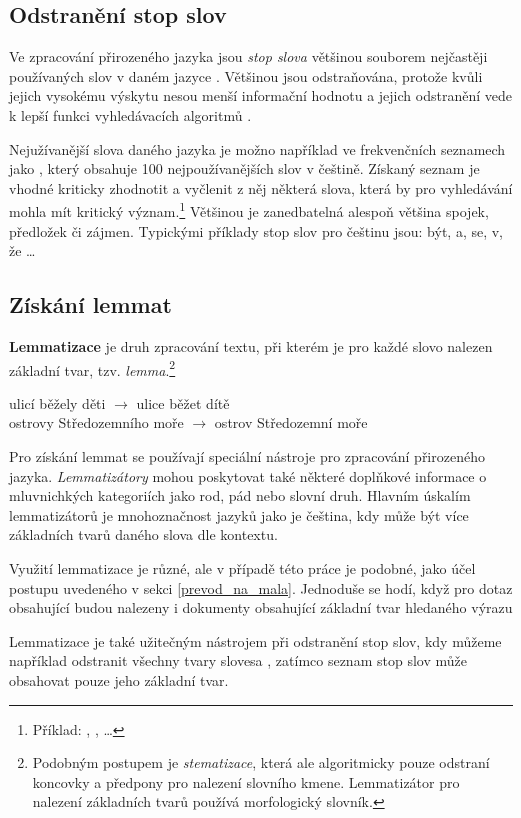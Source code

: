 \subsection{Odstranění stop slov}
\label{stopwords}
Ve zpracování přirozeného jazyka jsou \emph{stop slova} většinou souborem nejčastěji používaných slov v daném jazyce \cite{wiki:stopwords}. Většinou jsou odstraňována, protože kvůli jejich vysokému výskytu nesou menší informační hodnotu a jejich odstranění vede k lepší funkci vyhledávacích algoritmů \cite{bm25_improvements}.\par
Nejužívanější slova daného jazyka je možno například ve frekvenčních seznamech jako \cite{wiki:frekvencni_seznam}, který obsahuje 100 nejpoužívanějších slov v češtině. Získaný seznam je vhodné kriticky zhodnotit a vyčlenit z něj některá slova, která by pro vyhledávání mohla mít kritický význam.\footnote{Příklad: , ,  \dots} Většinou je zanedbatelná alespoň většina spojek, předložek či zájmen. Typickými příklady stop slov pro češtinu jsou: být, a, se, v, že \dots

\subsection{Získání lemmat}
\textbf{Lemmatizace} je druh zpracování textu, při kterém je pro každé slovo nalezen základní tvar, tzv. \emph{lemma}.\footnote{Podobným postupem je \emph{stematizace}, která ale algoritmicky pouze odstraní koncovky a předpony pro nalezení slovního kmene. Lemmatizátor pro nalezení základních tvarů používá morfologický slovník.}
\begin{center}
    ulicí běžely děti $\longrightarrow$ ulice běžet dítě\\
    ostrovy Středozemního moře $\longrightarrow$ ostrov Středozemní moře
\end{center}
Pro získání lemmat se používají speciální nástroje pro zpracování přirozeného jazyka. \emph{Lemma\-tizátory} mohou poskytovat také některé doplňkové informace o mluvnichkých kategoriích jako rod, pád nebo slovní druh. Hlavním úskalím lemmatizátorů je mnohoznačnost jazyků jako je čeština, kdy může být více základních tvarů daného slova dle kontextu\cite{wiki:lemmatizator}.\par
Využití lemmatizace je různé, ale v případě této práce je podobné, jako účel postupu uvedeného v sekci \ref{prevod_na_mala}. Jednoduše se hodí, když pro dotaz obsahující  budou nalezeny i dokumenty obsahující základní tvar hledaného výrazu \par
Lemmatizace je také užitečným nástrojem při odstranění stop slov, kdy můžeme například odstranit všechny tvary slovesa , zatímco seznam stop slov může obsahovat pouze jeho základní tvar.


